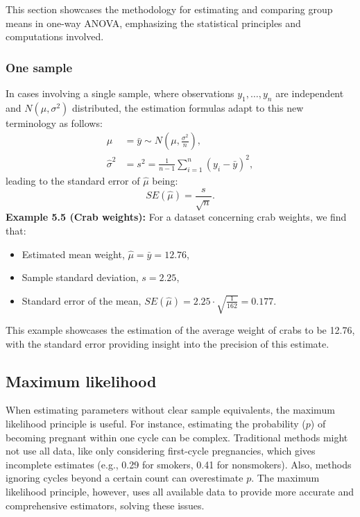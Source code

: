 \documentclass{article}
\begin{document}
This section showcases the methodology for estimating and comparing group means in one-way ANOVA, emphasizing the statistical principles and computations involved.


\subsubsection{One sample}

In cases involving a single sample, where observations \(y_1, \ldots, y_n\) are independent and \(N(\mu, \sigma^2)\) distributed, the estimation formulas adapt to this new terminology as follows:
\begin{align}
\hat{\mu} &= \bar{y} \sim N\left(\mu, \frac{\sigma^2}{n}\right), \\
\hat{\sigma}^2 &= s^2 = \frac{1}{n - 1} \sum_{i=1}^{n} (y_i - \bar{y})^2,
\end{align}
leading to the standard error of \(\hat{\mu}\) being:
\begin{equation}
SE(\hat{\mu}) = \frac{s}{\sqrt{n}}.
\end{equation}
\textbf{Example 5.5 (Crab weights):} For a dataset concerning crab weights, we find that:
\begin{itemize}
\item Estimated mean weight, \(\hat{\mu} = \bar{y} = 12.76\),
\item Sample standard deviation, \(s = 2.25\),
\item Standard error of the mean, \(SE(\hat{\mu}) = 2.25 \cdot \sqrt{\frac{1}{162}} = 0.177\).
\end{itemize}
This example showcases the estimation of the average weight of crabs to be 12.76, with the standard error providing insight into the precision of this estimate.


\subsection{Maximum likelihood}

When estimating parameters without clear sample equivalents, the maximum likelihood principle is useful. For instance, estimating the probability ($p$) of becoming pregnant within one cycle can be complex. Traditional methods might not use all data, like only considering first-cycle pregnancies, which gives incomplete estimates (e.g., 0.29 for smokers, 0.41 for nonsmokers). Also, methods ignoring cycles beyond a certain count can overestimate $p$. The maximum likelihood principle, however, uses all available data to provide more accurate and comprehensive estimators, solving these issues.
\end{document}
